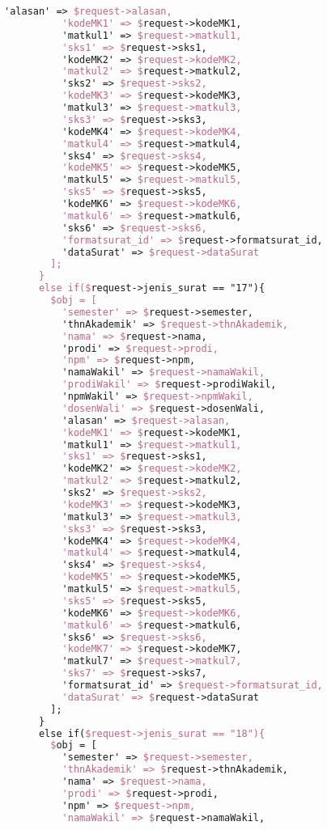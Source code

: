 \begin{lstlisting}[language=tex,basicstyle=\tiny,caption=PesanansuratController.php]
          'alasan' => $request->alasan,
          'kodeMK1' => $request->kodeMK1,
          'matkul1' => $request->matkul1,
          'sks1' => $request->sks1,
          'kodeMK2' => $request->kodeMK2,
          'matkul2' => $request->matkul2,
          'sks2' => $request->sks2,
          'kodeMK3' => $request->kodeMK3,
          'matkul3' => $request->matkul3,
          'sks3' => $request->sks3,
          'kodeMK4' => $request->kodeMK4,
          'matkul4' => $request->matkul4,
          'sks4' => $request->sks4,
          'kodeMK5' => $request->kodeMK5,
          'matkul5' => $request->matkul5,
          'sks5' => $request->sks5,
          'kodeMK6' => $request->kodeMK6,
          'matkul6' => $request->matkul6,
          'sks6' => $request->sks6,
          'formatsurat_id' => $request->formatsurat_id,
          'dataSurat' => $request->dataSurat
        ];
      }
      else if($request->jenis_surat == "17"){
        $obj = [
          'semester' => $request->semester,
          'thnAkademik' => $request->thnAkademik,
          'nama' => $request->nama,
          'prodi' => $request->prodi,
          'npm' => $request->npm,
          'namaWakil' => $request->namaWakil,
          'prodiWakil' => $request->prodiWakil,
          'npmWakil' => $request->npmWakil,
          'dosenWali' => $request->dosenWali,
          'alasan' => $request->alasan,
          'kodeMK1' => $request->kodeMK1,
          'matkul1' => $request->matkul1,
          'sks1' => $request->sks1,
          'kodeMK2' => $request->kodeMK2,
          'matkul2' => $request->matkul2,
          'sks2' => $request->sks2,
          'kodeMK3' => $request->kodeMK3,
          'matkul3' => $request->matkul3,
          'sks3' => $request->sks3,
          'kodeMK4' => $request->kodeMK4,
          'matkul4' => $request->matkul4,
          'sks4' => $request->sks4,
          'kodeMK5' => $request->kodeMK5,
          'matkul5' => $request->matkul5,
          'sks5' => $request->sks5,
          'kodeMK6' => $request->kodeMK6,
          'matkul6' => $request->matkul6,
          'sks6' => $request->sks6,
          'kodeMK7' => $request->kodeMK7,
          'matkul7' => $request->matkul7,
          'sks7' => $request->sks7,
          'formatsurat_id' => $request->formatsurat_id,
          'dataSurat' => $request->dataSurat
        ];
      }
      else if($request->jenis_surat == "18"){
        $obj = [
          'semester' => $request->semester,
          'thnAkademik' => $request->thnAkademik,
          'nama' => $request->nama,
          'prodi' => $request->prodi,
          'npm' => $request->npm,
          'namaWakil' => $request->namaWakil,

\end{lstlisting}
